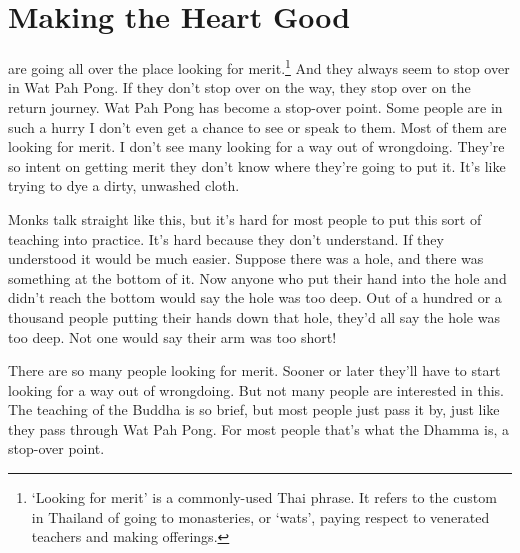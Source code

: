 
\chapter{Making the Heart Good}

 are going all over the place looking for merit.\footnote{`Looking for merit' is a commonly-used Thai phrase. It refers to the custom in Thailand of going to monasteries, or `wats', paying respect to venerated teachers and making offerings.} And they always seem to stop over in Wat Pah Pong. If they don't stop over on the way, they stop over on the return journey. Wat Pah Pong has become a stop-over point. Some people are in such a hurry I don't even get a chance to see or speak to them. Most of them are looking for merit. I don't see many looking for a way out of wrongdoing. They're so intent on getting merit they don't know where they're going to put it. It's like trying to dye a dirty, unwashed cloth. 

Monks talk straight like this, but it's hard for most people to put this sort of teaching into practice. It's hard because they don't understand. If they understood it would be much easier. Suppose there was a hole, and there was something at the bottom of it. Now anyone who put their hand into the hole and didn't reach the bottom would say the hole was too deep. Out of a hundred or a thousand people putting their hands down that hole, they'd all say the hole was too deep. Not one would say their arm was too short! 

There are so many people looking for merit. Sooner or later they'll have to start looking for a way out of wrongdoing. But not many people are interested in this. The teaching of the Buddha is so brief, but most people just pass it by, just like they pass through Wat Pah Pong. For most people that's what the Dhamma is, a stop-over point. 

